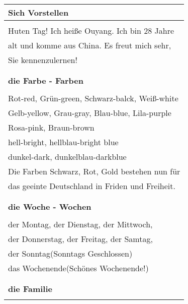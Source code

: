 \documentclass[12pt]{article}
\begin{document}
\begin{multicols}{2}
	\begin{tabular}{l}

		\textbf{Sich Vorstellen}                              \\
		\hline                                                \\
		Huten Tag! Ich heiße Ouyang. Ich bin 28 Jahre         \\
		alt und komme aus China. Es freut mich sehr,          \\
		Sie kennenzulernen!                                   \\
		\\
		\\

		\textbf{die Farbe - Farben}                           \\
		\hline                                                \\
		Rot-red, Grün-green, Schwarz-balck, Weiß-white        \\
		Gelb-yellow, Grau-gray, Blau-blue, Lila-purple        \\
		Rosa-pink, Braun-brown                                \\
		hell-bright, hellblau-bright blue                     \\
		dunkel-dark, dunkelblau-darkblue                      \\
		Die Farben Schwarz, Rot, Gold bestehen nun für        \\
		das geeinte Deutschland in Friden und Freiheit.       \\
		\\
		\\
		\textbf{die Woche - Wochen}                           \\
		\hline                                                \\
		der Montag, der Dienstag, der Mittwoch,               \\
		der Donnerstag, der Freitag, der Samtag,              \\
		der Sonntag(Sonntags Geschlossen)                     \\
		das Wochenende(Schönes Wochenende!)                   \\
		\\
		\\
		\textbf{die Familie}                                  \\
		\hline                                                \\

\end{tabular}
\end{multicols}
\end{document}
